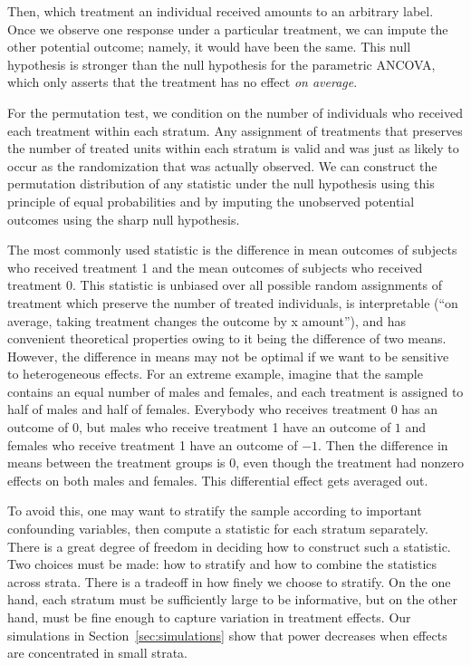 \documentclass[12pt]{article}
\begin{document}
Then, which treatment an individual received amounts to an arbitrary label.
Once we observe one response under a particular treatment, we can impute the other potential outcome; namely, it would have been the same.
This null hypothesis is stronger than the null hypothesis for the parametric ANCOVA, which only asserts that the treatment has no effect \textit{on average}.

For the permutation test, we condition on the number of individuals who received each treatment within each stratum.
Any assignment of treatments that preserves the number of treated units within each stratum is valid and was just as likely to occur as the randomization that was actually observed.
We can construct the permutation distribution of any statistic under the null hypothesis using this principle of equal probabilities and by imputing the unobserved potential outcomes using the sharp null hypothesis.

The most commonly used statistic is the difference in mean outcomes of subjects who received treatment 1 and the mean outcomes of subjects who received treatment 0.  
This statistic is unbiased over all possible random assignments of treatment which preserve the number of treated individuals,
is interpretable (``on average, taking treatment changes the outcome by x amount''), 
and has convenient theoretical properties owing to it being the difference of two means.
However, the difference in means may not be optimal if we want to be sensitive to heterogeneous effects.  
For an extreme example, imagine that the sample contains an equal number of males and females, and each treatment is assigned to half of males and half of females.  
Everybody who receives treatment 0 has an outcome of 0, but males who receive treatment 1 have an outcome of $1$ and females who receive treatment 1 have an outcome of $-1$.  
Then the difference in means between the treatment groups is $0$, even though the treatment had nonzero effects on both males and females.  
This differential effect gets averaged out.

To avoid this, one may want to stratify the sample according to important confounding variables, then compute a statistic for each stratum separately. 
There is a great degree of freedom in deciding how to construct such a statistic.
Two choices must be made: how to stratify and how to combine the statistics across strata.
There is a tradeoff in how finely we choose to stratify.
On the one hand, each stratum must be sufficiently large to be informative,
 but on the other hand, must be fine enough to capture variation in treatment effects.
Our simulations in Section~\ref{sec:simulations} show that power decreases when effects are concentrated in small strata.
\end{document}
